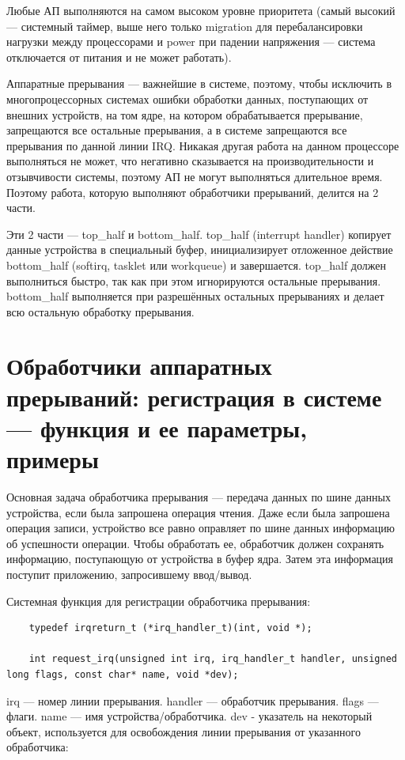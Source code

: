 Любые АП выполняются на самом высоком уровне приоритета (самый высокий --- системный таймер, выше него только migration для перебалансировки нагрузки между процессорами и power при падении напряжения --- система отключается от питания и не может работать).

Аппаратные прерывания --- важнейшие в системе, поэтому, чтобы исключить в многопроцессорных системах ошибки обработки данных, поступающих от внешних устройств, на том ядре, на котором обрабатывается прерывание, запрещаются все остальные прерывания, а в системе запрещаются все прерывания по данной линии IRQ. Никакая другая работа на данном процессоре выполняться не может, что негативно сказывается на производительности и отзывчивости системы, поэтому АП не могут выполняться длительное время. Поэтому работа, которую выполняют обработчики прерываний, делится на 2 части.

Эти 2 части --- top\_half и bottom\_half. top\_half (interrupt handler) копирует данные устройства в специальный буфер, инициализирует отложенное действие bottom\_half (softirq, tasklet или workqueue) и завершается. top\_half должен выполниться быстро, так как при этом игнорируются остальные прерывания. bottom\_half выполняется при разрешённых остальных прерываниях и делает всю остальную обработку прерывания.

\section{Обработчики аппаратных прерываний: регистрация в системе --- функция и ее параметры, примеры}

Основная задача обработчика прерывания --- передача данных по шине данных устройства, если была запрошена операция чтения. Даже если была запрошена операция записи, устройство все равно оправляет по шине данных информацию об успешности операции. Чтобы обработать ее, обработчик должен сохранять информацию, поступающую от устройства в буфер ядра. Затем эта информация поступит приложению, запросившему ввод/вывод.

Системная функция для регистрации обработчика прерывания:

\begin{lstlisting}
	typedef irqreturn_t (*irq_handler_t)(int, void *); 
	
	int request_irq(unsigned int irq, irq_handler_t handler, unsigned long flags, const char* name, void *dev);
\end{lstlisting}

irq --- номер линии прерывания. handler --- обработчик прерывания. flags --- флаги. name --- имя устройства/обработчика. dev - указатель на некоторый объект, используется для освобождения линии прерывания от указанного обработчика:

